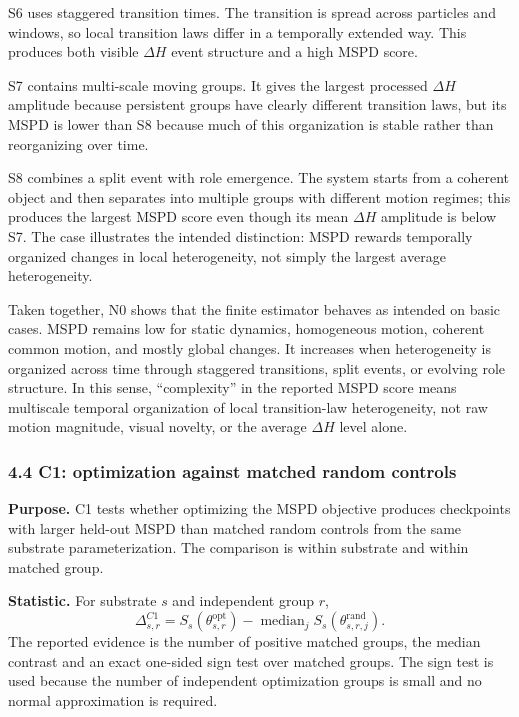 S6 uses staggered transition times.  The transition is spread across particles and windows, so local transition laws differ in a temporally extended way.  This produces both visible $\Delta H$ event structure and a high MSPD score.

S7 contains multi-scale moving groups.  It gives the largest processed $\Delta H$ amplitude because persistent groups have clearly different transition laws, but its MSPD is lower than S8 because much of this organization is stable rather than reorganizing over time.

S8 combines a split event with role emergence.  The system starts from a coherent object and then separates into multiple groups with different motion regimes; this produces the largest MSPD score even though its mean $\Delta H$ amplitude is below S7.  The case illustrates the intended distinction: MSPD rewards temporally organized changes in local heterogeneity, not simply the largest average heterogeneity.

Taken together, N0 shows that the finite estimator behaves as intended on basic cases.  MSPD remains low for static dynamics, homogeneous motion, coherent common motion, and mostly global changes.  It increases when heterogeneity is organized across time through staggered transitions, split events, or evolving role structure.  In this sense, ``complexity'' in the reported MSPD score means multiscale temporal organization of local transition-law heterogeneity, not raw motion magnitude, visual novelty, or the average $\Delta H$ level alone.


\subsubsection*{4.4 C1: optimization against matched random controls}
\label{experiments:c1}

\textbf{Purpose.}  C1 tests whether optimizing the MSPD objective produces checkpoints with larger held-out MSPD than matched random controls from the same substrate parameterization.  The comparison is within substrate and within matched group.

\textbf{Statistic.}  For substrate $s$ and independent group $r$,
\[
  \Delta^{C1}_{s,r}
  =S_s(\theta^{\mathrm{opt}}_{s,r})
  -\operatorname{median}_{j}S_s(\theta^{\mathrm{rand}}_{s,r,j}).
\]
The reported evidence is the number of positive matched groups, the median contrast and an exact one-sided sign test over matched groups.  The sign test is used because the number of independent optimization groups is small and no normal approximation is required.

